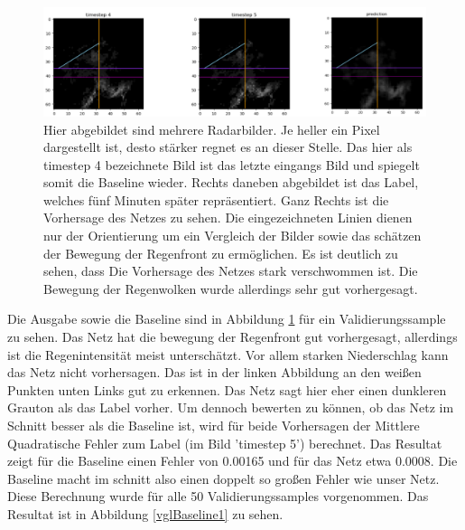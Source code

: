 \begin{figure}[h]
	\centering
	\includegraphics[width=\linewidth]{pics/mse_vgl1.png}
	\caption[Radarbilder für Fünf minuten Vorhersage]{Hier abgebildet sind mehrere Radarbilder. Je heller ein Pixel dargestellt ist, desto stärker regnet es an dieser Stelle. Das hier als timestep 4 bezeichnete Bild ist das letzte eingangs Bild und spiegelt somit die Baseline wieder. Rechts daneben abgebildet ist das Label, welches fünf Minuten später repräsentiert. Ganz Rechts ist die Vorhersage des Netzes zu sehen. Die eingezeichneten Linien dienen nur der Orientierung um ein Vergleich der Bilder sowie das schätzen der Bewegung der Regenfront zu ermöglichen. Es ist deutlich zu sehen, dass Die Vorhersage des Netzes stark verschwommen ist. Die Bewegung der Regenwolken wurde allerdings sehr gut vorhergesagt. }
	\label{mse_VGL1}
\end{figure}

Die Ausgabe sowie die Baseline sind in Abbildung \ref{mse_VGL1} für ein Validierungssample zu sehen. Das Netz hat die bewegung der Regenfront gut vorhergesagt, allerdings ist die Regenintensität meist unterschätzt. Vor allem starken Niederschlag kann das Netz nicht vorhersagen. Das ist in der linken Abbildung an den weißen Punkten unten Links gut zu erkennen. Das Netz sagt hier eher einen dunkleren Grauton als das Label vorher. Um dennoch bewerten zu können, ob das Netz im Schnitt besser als die Baseline ist, wird für beide Vorhersagen der Mittlere Quadratische Fehler zum Label (im Bild 'timestep 5') berechnet. Das Resultat zeigt für die Baseline einen Fehler von 0.00165 und für das Netz etwa 0.0008. Die Baseline macht im schnitt also einen doppelt so großen Fehler wie unser Netz. Diese Berechnung wurde für alle 50 Validierungssamples vorgenommen. Das Resultat ist in Abbildung \ref{vglBaseline1} zu sehen.

